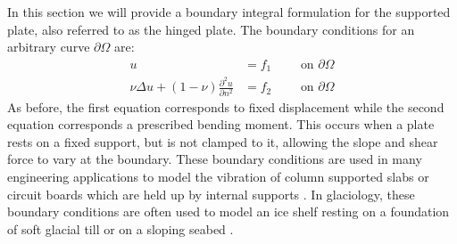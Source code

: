 \documentclass[preprint,12pt,3p]{elsarticle}
\begin{document}
In this section we will provide a boundary integral formulation for the supported plate, also referred to as the hinged plate. The boundary conditions for an arbitrary curve $\partial \Omega$ are: 
\begin{align}
    u &= f_1 \qquad \text{ on } \partial \Omega \label{sp1} \\
    \nu \Delta u + (1-\nu) \frac{\partial^2 u}{\partial n^2}&= f_2 \qquad \text{ on } \partial \Omega \label{sp2} 
\end{align}
As before, the first equation corresponds to fixed displacement while the second equation corresponds a prescribed bending moment. This occurs when a plate rests on a fixed support, but is not clamped to it, allowing the slope and shear force to vary at the boundary. These boundary conditions are used in many engineering applications to model the vibration of column supported slabs or circuit boards which are held up by internal supports \cite{zhao2002plate, seide1958}. In glaciology, these boundary conditions are often used to model an ice shelf  resting on a foundation of soft glacial till \cite{WALKER2013422} or on a sloping seabed \cite{HOLDSWORTH1981, MEYLAND2021}.
\end{document}
